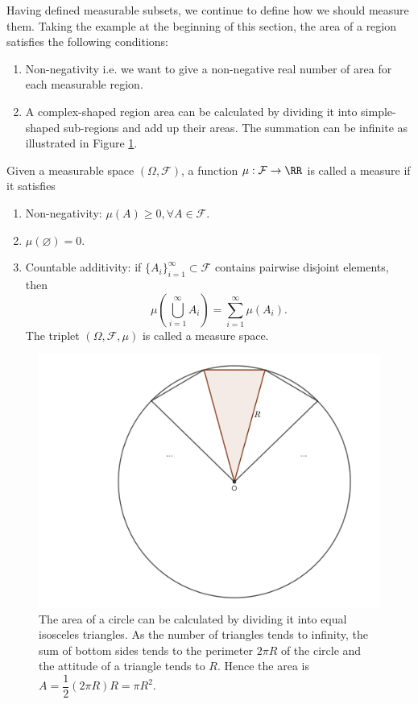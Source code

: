 Having defined measurable subsets, we continue to define how we should measure them. Taking the example at the beginning of this section, the area of a region satisfies the following conditions:
\begin{enumerate}
  \item Non-negativity i.e. we want to give a non-negative real number of area for each measurable region.
  \item A complex-shaped region area can be calculated by dividing it into simple-shaped sub-regions and add up their areas. The summation can be infinite as illustrated in Figure \ref{figure:circle}.
\end{enumerate}

\begin{definition}
  Given a measurable space $(\Omega,\mathcal{F})$, a function $\mu:\mathcal{F}\to\RR$ is called a measure if it satisfies
  \begin{enumerate}
    \item Non-negativity: $\mu(A)\ge0,\forall A\in\mathcal{F}.$
    \item $\mu(\varnothing)=0$.
    \item Countable additivity: if $\{A_i\}_{i=1}^\infty\subset\mathcal{F}$ contains pairwise disjoint elements, then
          $$\mu\left(\bigcup\limits_{i=1}^\infty A_i\right)=\sum\limits_{i=1}^\infty \mu(A_i).$$
          The triplet $(\Omega,\mathcal{F},\mu)$ is called a measure space.
  \end{enumerate}
\end{definition}

\begin{figure}[h]
  \centering
  \includegraphics[width=0.4\linewidth]{img/circle.png}
  \vspace{0.5cm}
  \caption[Circle area approximation]{The area of a circle can be calculated by dividing it into equal isosceles triangles. As the number of triangles tends to infinity, the sum of bottom sides tends to the perimeter $2\pi R$ of the circle and the attitude of a triangle tends to $R$. Hence the area is $A=\dfrac{1}{2}(2\pi R)R=\pi R^2$.}
  \label{figure:circle}
\end{figure}

